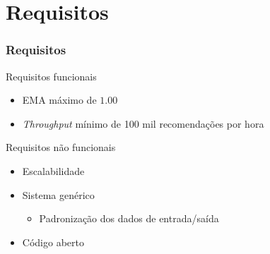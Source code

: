 \section[Requisitos]{Requisitos}
\begin{frame}
\frametitle{Requisitos}
\begin{block}{Requisitos funcionais}
\begin{itemize}
	\item EMA máximo de $1.00$  
	\item \textit{Throughput} mínimo de 100 mil recomendações por hora
\end{itemize}
\end{block}

\begin{block}{Requisitos não funcionais}
\begin{itemize}
	\item Escalabilidade
	\item Sistema genérico
	\begin{itemize}
		\item Padronização dos dados de entrada/saída
	\end{itemize}
	\item Código aberto
\end{itemize}
\end{block}
\end{frame}
